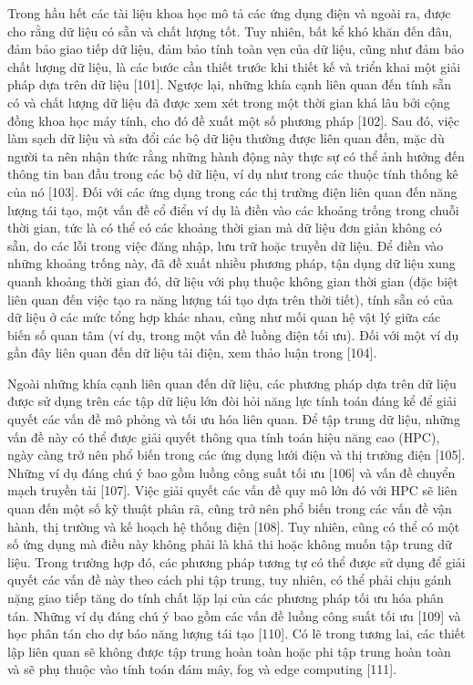 \documentclass[utf8]{frontiersSCNS} %
\begin{document}
Trong hầu hết các tài liệu khoa học mô tả các ứng dụng điện và ngoài ra, được cho rằng dữ liệu có sẵn và chất lượng tốt. Tuy nhiên, bất kể khó khăn đến đâu, đảm bảo giao tiếp dữ liệu, đảm bảo tính toàn vẹn của dữ liệu, cũng như đảm bảo chất lượng dữ liệu, là các bước cần thiết trước khi thiết kế và triển khai một giải pháp dựa trên dữ liệu [101]. Ngược lại, những khía cạnh liên quan đến tính sẵn có và chất lượng dữ liệu đã được xem xét trong một thời gian khá lâu bởi cộng đồng khoa học máy tính, cho đó đề xuất một số phương pháp [102]. Sau đó, việc làm sạch dữ liệu và sửa đổi các bộ dữ liệu thường được liên quan đến, mặc dù người ta nên nhận thức rằng những hành động này thực sự có thể ảnh hưởng đến thông tin ban đầu trong các bộ dữ liệu, ví dụ như trong các thuộc tính thống kê của nó [103]. Đối với các ứng dụng trong các thị trường điện liên quan đến năng lượng tái tạo, một vấn đề cổ điển ví dụ là điền vào các khoảng trống trong chuỗi thời gian, tức là có thể có các khoảng thời gian mà dữ liệu đơn giản không có sẵn, do các lỗi trong việc đăng nhập, lưu trữ hoặc truyền dữ liệu. Để điền vào những khoảng trống này, đã đề xuất nhiều phương pháp, tận dụng dữ liệu xung quanh khoảng thời gian đó, dữ liệu với phụ thuộc không gian thời gian (đặc biệt liên quan đến việc tạo ra năng lượng tái tạo dựa trên thời tiết), tính sẵn có của dữ liệu ở các mức tổng hợp khác nhau, cũng như mối quan hệ vật lý giữa các biến số quan tâm (ví dụ, trong một vấn đề luồng điện tối ưu). Đối với một ví dụ gần đây liên quan đến dữ liệu tải điện, xem thảo luận trong [104].

Ngoài những khía cạnh liên quan đến dữ liệu, các phương pháp dựa trên dữ liệu được sử dụng trên các tập dữ liệu lớn đòi hỏi năng lực tính toán đáng kể để giải quyết các vấn đề mô phỏng và tối ưu hóa liên quan. Để tập trung dữ liệu, những vấn đề này có thể được giải quyết thông qua tính toán hiệu năng cao (HPC), ngày càng trở nên phổ biến trong các ứng dụng lưới điện và thị trường điện [105]. Những ví dụ đáng chú ý bao gồm luồng công suất tối ưu [106] và vấn đề chuyển mạch truyền tải [107]. Việc giải quyết các vấn đề quy mô lớn đó với HPC sẽ liên quan đến một số kỹ thuật phân rã, cũng trở nên phổ biến trong các vấn đề vận hành, thị trường và kế hoạch hệ thống điện [108]. Tuy nhiên, cũng có thể có một số ứng dụng mà điều này không phải là khả thi hoặc không muốn tập trung dữ liệu. Trong trường hợp đó, các phương pháp tương tự có thể được sử dụng để giải quyết các vấn đề này theo cách phi tập trung, tuy nhiên, có thể phải chịu gánh nặng giao tiếp tăng do tính chất lặp lại của các phương pháp tối ưu hóa phân tán. Những ví dụ đáng chú ý bao gồm các vấn đề luồng công suất tối ưu [109] và học phân tán cho dự báo năng lượng tái tạo [110]. Có lẽ trong tương lai, các thiết lập liên quan sẽ không được tập trung hoàn toàn hoặc phi tập trung hoàn toàn và sẽ phụ thuộc vào tính toán đám mây, fog và edge computing [111].
\end{document}
